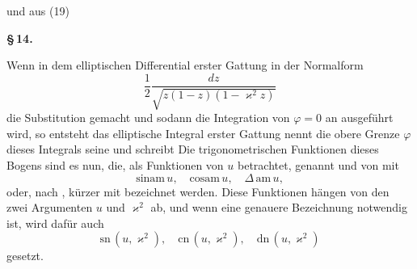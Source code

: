 

und aus (19)


\begin{center}
\textbf{\S\,14. }
\end{center}

Wenn in dem elliptischen Differential erster Gattung in der  Normalform
\[
\frac{1}{2}\frac{dz}{\sqrt{z(1-z)(1-\varkappa^2 z)}}
\]
die Substitution
gemacht und sodann die Integration von $\varphi = 0$ an ausgeführt wird, so entsteht das elliptische Integral erster Gattung
 nennt die obere Grenze $\varphi$ dieses Integrals seine  und schreibt
Die trigonometrischen Funktionen dieses Bogens
sind es nun, die, als Funktionen von $u$ betrachtet,  genannt und von  mit
\[
\mathrm{sinam}\,u,\quad \mathrm{cosam}\,u,\quad \Delta\,\mathrm{am}\,u,
\]
oder, nach , kürzer mit
bezeichnet werden. Diese Funktionen hängen von den zwei Argumenten $u$ und $\varkappa^2$ ab, und wenn eine genauere Bezeichnung notwendig ist, wird dafür auch
\[
\mathrm{sn}\,(u,\varkappa^2),\quad \mathrm{cn}\,(u,\varkappa^2),\quad \mathrm{dn}\,(u,\varkappa^2)
\]
gesetzt.
